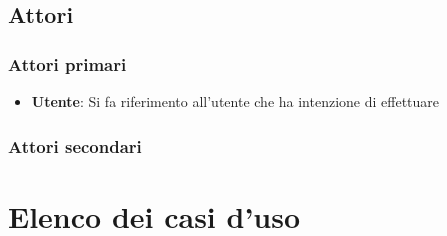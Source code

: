 \documentclass[../analisi-dei-requisiti.tex]{subfiles}
\begin{document}
%
\subsection{Attori}%
\label{subs:attori}

\subsubsection{Attori primari}%
\label{sssec:attori_primari}
\begin{itemize}
    \item \textbf{Utente}: Si fa riferimento all'utente che ha intenzione di effettuare  
  \end{itemize}


\subsubsection{Attori secondari}
\label{sssec:attori_secondari}

\newpage
\section{Elenco dei casi d'uso}
\label{subs:elenco_dei_casi_duso}







\end{document}
